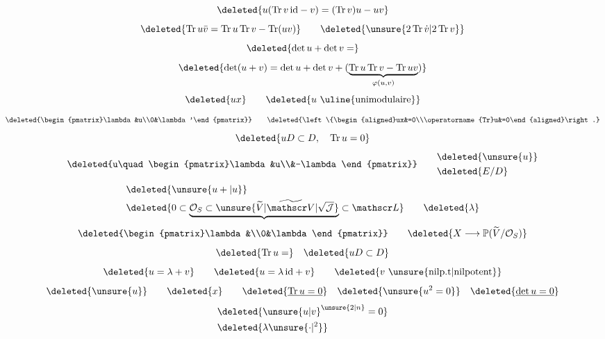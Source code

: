 \[
\deleted{u(\operatorname{Tr}v\,\mathrm{id}-v)=(\operatorname{Tr}v)u-uv}
\]
\[
\deleted{\operatorname{Tr}u\bar v=\operatorname{Tr}u\operatorname{Tr}v-\operatorname{Tr}(uv)}
\qquad \deleted{\unsure{2\operatorname{Tr}\dot v|2\operatorname{Tr}v}}
\]
\[
\deleted{\det u+\det v=}
\]
\[
\deleted{\det(u+v)=\det u+\det v+
(\underbrace{\operatorname{Tr}u\operatorname{Tr}v-\operatorname{Tr}uv}_{\varphi(u,v)})}
\]
\[
\deleted{ux}\qquad\deleted{u\ \text{\uline{unimodulaire}}}
\]
\[
\deleted{\begin{pmatrix}\lambda&u\\0&\lambda'\end{pmatrix}}
\qquad\deleted{\left\{\begin{aligned}ux&=0\\\operatorname{Tr}u&=0\end{aligned}\right.}
\]
\[
\deleted{uD\subset D,\quad\operatorname{Tr}u=0}
\]
\[
\deleted{u\quad\begin{pmatrix}\lambda&u\\&-\lambda\end{pmatrix}}\qquad
\begin{aligned}&\deleted{\unsure{u}}\\&\deleted{E/D}\end{aligned}
\]
\[
\begin{aligned}
&\deleted{\unsure{u+|u}}\\
&\deleted{0\subset\underbrace{\mathcal O_S\subset\unsure{\widetilde V|\widetilde{\mathscr V}|\sqrt{\mathcal{J}}}}\subset\mathscr L}\qquad\deleted{\lambda}
\end{aligned}
\]
\[
\deleted{\begin{pmatrix}\lambda&\\0&\lambda\end{pmatrix}}\qquad
\deleted{X\longrightarrow\mathbb P(\widetilde V/\mathcal O_S)}
\]
\[
\deleted{\operatorname{Tr}u=}\quad \deleted{uD\subset D}
\]
\[
\deleted{u=\lambda+v}\qquad\deleted{u=\lambda\,\mathrm{id}+v}\qquad
\deleted{v\ \text{\unsure{nilp.t|nilpotent}}}
\]
\[
\deleted{\unsure{u}}\qquad\deleted{x}\qquad\deleted{\underline{\operatorname{Tr}u=0}}
\quad\deleted{\unsure{u^2=0}}\quad\deleted{\underline{\det u=0}}
\]
\[
\begin{aligned}&\deleted{\unsure{u|v}^{\unsure{2|n}}=0}\\&\deleted{\lambda\unsure{\cdot|{}^{2}}}\end{aligned}
\]

